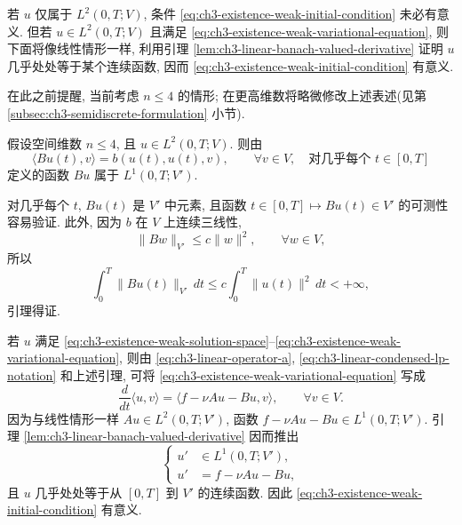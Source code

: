 若 $u$ 仅属于 $L^2(0,T;V)$, 条件 \eqref{eq:ch3-existence-weak-initial-condition} 未必有意义. 但若 $u\in L^2(0,T;V)$ 且满足 \eqref{eq:ch3-existence-weak-variational-equation}, 则下面将像线性情形一样, 利用引理 \ref{lem:ch3-linear-banach-valued-derivative} 证明 $u$ 几乎处处等于某个连续函数, 因而 \eqref{eq:ch3-existence-weak-initial-condition} 有意义.

在此之前提醒, 当前考虑 $n\leq4$ 的情形; 在更高维数将略微修改上述表述(见第 \ref{subsec:ch3-semidiscrete-formulation} 小节).

\begin{Lemma}
\label{lem:ch3-existence-bu-integrability}
假设空间维数 $n\leq4$, 且 $u\in L^2(0,T;V)$. 则由
\[
\langle Bu(t),v\rangle=b(u(t),u(t),v),
\qquad\forall v\in V,\quad\text{对几乎每个 }t\in[0,T]
\]
定义的函数 $Bu$ 属于 $L^1(0,T;V')$.
\end{Lemma}

\hypertarget{chapter-03-page-206}{}
\begin{Proof}
对几乎每个 $t$, $Bu(t)$ 是 $V'$ 中元素, 且函数 $t\in[0,T]\mapsto Bu(t)\in V'$ 的可测性容易验证. 此外, 因为 $b$ 在 $V$ 上连续三线性,
\begin{equation}
\lVert Bw\rVert_{V'}\leq c\lVert w\rVert^2,
\qquad\forall w\in V,
\label{eq:ch3-existence-bu-pointwise-bound}
\end{equation}
所以
\[
\int_0^T\lVert Bu(t)\rVert_{V'}\,dt
\leq c\int_0^T\lVert u(t)\rVert^2\,dt<+\infty,
\]
引理得证.
\end{Proof}

若 $u$ 满足 \eqref{eq:ch3-existence-weak-solution-space}--\eqref{eq:ch3-existence-weak-variational-equation}, 则由 \eqref{eq:ch3-linear-operator-a}, \eqref{eq:ch3-linear-condensed-lp-notation} 和上述引理, 可将 \eqref{eq:ch3-existence-weak-variational-equation} 写成
\[
\frac d{dt}\langle u,v\rangle
=\langle f-\nu Au-Bu,v\rangle,
\qquad\forall v\in V.
\]
因为与线性情形一样 $Au\in L^2(0,T;V')$, 函数 $f-\nu Au-Bu\in L^1(0,T;V')$. 引理 \ref{lem:ch3-linear-banach-valued-derivative} 因而推出
\begin{equation}
\left\{
\begin{aligned}
u'&\in L^1(0,T;V'),\\
u'&=f-\nu Au-Bu,
\end{aligned}
\right.
\label{eq:ch3-existence-time-derivative}
\end{equation}
且 $u$ 几乎处处等于从 $[0,T]$ 到 $V'$ 的连续函数. 因此 \eqref{eq:ch3-existence-weak-initial-condition} 有意义.


